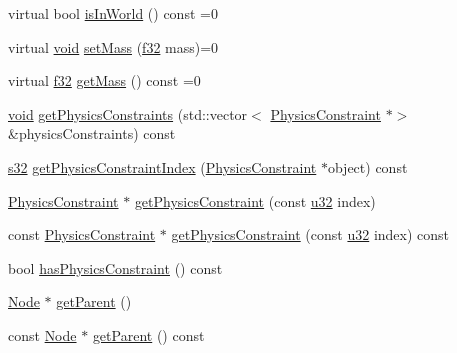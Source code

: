 \begin{DoxyCompactItemize}
\item 
virtual bool \mbox{\hyperlink{classnjli_1_1_physics_body_a9f98398ebd273f305ffb8316908d8088}{is\+In\+World}} () const =0
\item 
virtual \mbox{\hyperlink{_thread_8h_af1e856da2e658414cb2456cb6f7ebc66}{void}} \mbox{\hyperlink{classnjli_1_1_physics_body_a2418ec20e73cfe304bac23e306daebcd}{set\+Mass}} (\mbox{\hyperlink{_util_8h_a5f6906312a689f27d70e9d086649d3fd}{f32}} mass)=0
\item 
virtual \mbox{\hyperlink{_util_8h_a5f6906312a689f27d70e9d086649d3fd}{f32}} \mbox{\hyperlink{classnjli_1_1_physics_body_a6f86b5736d90e252ec239357835377e9}{get\+Mass}} () const =0
\item 
\mbox{\hyperlink{_thread_8h_af1e856da2e658414cb2456cb6f7ebc66}{void}} \mbox{\hyperlink{classnjli_1_1_physics_body_a62a572e1c500a90ade8e279d72664123}{get\+Physics\+Constraints}} (std\+::vector$<$ \mbox{\hyperlink{classnjli_1_1_physics_constraint}{Physics\+Constraint}} $\ast$$>$ \&physics\+Constraints) const
\item 
\mbox{\hyperlink{_util_8h_aa62c75d314a0d1f37f79c4b73b2292e2}{s32}} \mbox{\hyperlink{classnjli_1_1_physics_body_af17e37b5161cf45c98fb07607ec27eb6}{get\+Physics\+Constraint\+Index}} (\mbox{\hyperlink{classnjli_1_1_physics_constraint}{Physics\+Constraint}} $\ast$object) const
\item 
\mbox{\hyperlink{classnjli_1_1_physics_constraint}{Physics\+Constraint}} $\ast$ \mbox{\hyperlink{classnjli_1_1_physics_body_aa4e623ba19115b05486b415929a32016}{get\+Physics\+Constraint}} (const \mbox{\hyperlink{_util_8h_a10e94b422ef0c20dcdec20d31a1f5049}{u32}} index)
\item 
const \mbox{\hyperlink{classnjli_1_1_physics_constraint}{Physics\+Constraint}} $\ast$ \mbox{\hyperlink{classnjli_1_1_physics_body_ad0f774812e46bf37b786adf13b00ab4f}{get\+Physics\+Constraint}} (const \mbox{\hyperlink{_util_8h_a10e94b422ef0c20dcdec20d31a1f5049}{u32}} index) const
\item 
bool \mbox{\hyperlink{classnjli_1_1_physics_body_a4899553ad56d95577a74893b416db401}{has\+Physics\+Constraint}} () const
\item 
\mbox{\hyperlink{classnjli_1_1_node}{Node}} $\ast$ \mbox{\hyperlink{classnjli_1_1_physics_body_a9cd56ee4fa9e3258264ae7fa2a5a3a49}{get\+Parent}} ()
\item 
const \mbox{\hyperlink{classnjli_1_1_node}{Node}} $\ast$ \mbox{\hyperlink{classnjli_1_1_physics_body_adb2a13498a34dadc69c7746d88ca4a79}{get\+Parent}} () const
\item 
$$
\end{DoxyCompactItemize}
